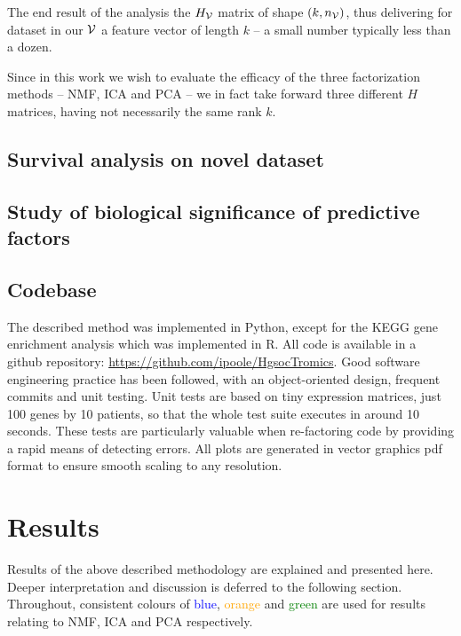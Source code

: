 \documentclass[draft, tikz, 12pt,a4paper,oneside,fleqn]{article}
\begin{document}
The end result of the analysis the $H_{\mathcal{V}}$ matrix of shape $(k, n_{\mathcal{V}})$, thus delivering for dataset in our $\mathcal{V}$ a feature vector of length $k$ -- a small number typically less than a dozen.

Since in this work we wish to evaluate the efficacy of the three factorization methods -- NMF, ICA and PCA -- we in fact take forward three different $H$ matrices, having not necessarily the same rank $k$.

\subsection{Survival analysis on novel dataset}

\subsection{Study of biological significance of predictive factors}

\subsection{Codebase}

The described method was implemented in Python, except for the KEGG gene enrichment analysis which was implemented in R.  All code is available in a github repository: \url{https://github.com/ipoole/HgsocTromics}.  Good software engineering practice has been followed, with an object-oriented design, frequent commits and unit testing.  Unit tests are based on tiny expression matrices, just 100 genes by 10 patients, so that the whole test suite executes in around 10 seconds.  These tests are particularly valuable when re-factoring code by providing a rapid means of detecting errors.  All plots are generated in vector graphics pdf format to ensure smooth scaling to any resolution. 




\section{Results}

Results of the above described methodology are explained and presented here.   Deeper interpretation and discussion is deferred to the following section.  Throughout, consistent colours of \textcolor{blue}{blue}, \textcolor{orange}{orange} and \textcolor{green}{green} are used for results relating to NMF, ICA and PCA respectively.
\end{document}
